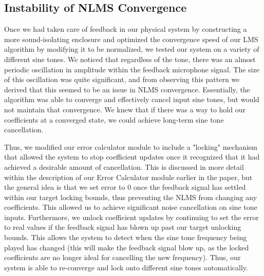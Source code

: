 \documentclass{fpgairpods}
\begin{document}
\subsection{Instability of NLMS Convergence}
Once we had taken care of feedback in our physical system by constructing a more sound-isolating enclosure and optimized the convergence speed of our LMS algorithm by modifying it to be normalized, we tested our system on a variety of different sine tones. We noticed that regardless of the tone, there was an almost periodic oscillation in amplitude within the feedback microphone signal. The size of this oscillation was quite significant, and from observing this pattern we derived that this seemed to be an issue in NLMS convergence. Essentially, the algorithm was able to converge and effectively cancel input sine tones, but would not maintain that convergence. We knew that if there was a way to hold our coefficients at a converged state, we could achieve long-term sine tone cancellation.

Thus, we modified our error calculator module to include a "locking" mechanism that allowed the system to stop coefficient updates once it recognized that it had achieved a desirable amount of cancellation. This is discussed in more detail within the description of our Error Calculator module earlier in the paper, but the general idea is that we set error to 0 once the feedback signal has settled within our target locking bounds, thus preventing the NLMS from changing any coefficients. This allowed us to achieve significant noise cancellation on sine tone inputs. Furthermore, we unlock coefficient updates by continuing to set the error to real values if the feedback signal has blown up past our target unlocking bounds. This allows the system to detect when the sine tone frequency being played has changed (this will make the feedback signal blow up, as the locked coefficients are no longer ideal for cancelling the new frequency). Thus, our system is able to re-converge and lock onto different sine tones automatically.
\end{document}
